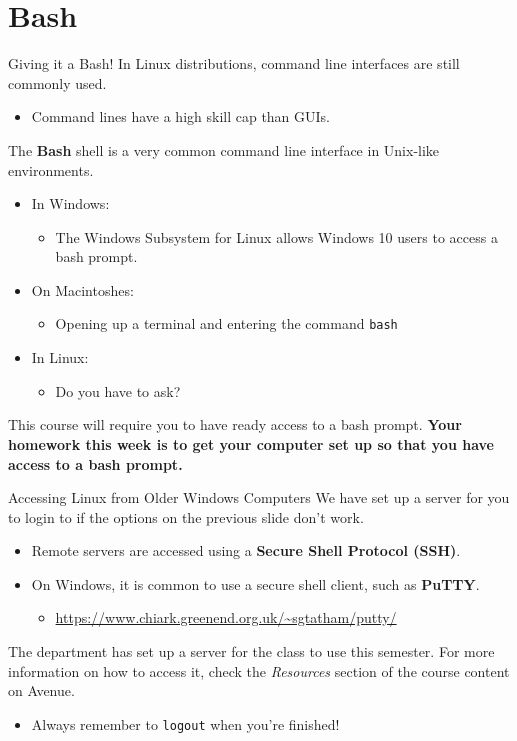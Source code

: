 \documentclass[11pt]{beamer}
\begin{document}
\section[Using a Command Line]{Bash}
\begin{frame}{Giving it a Bash!}
In Linux distributions, command line interfaces are still commonly used.
\begin{itemize}
\item Command lines have a high skill cap than GUIs.  
\end{itemize}
The \textbf{Bash} shell is a very common command line interface in Unix-like environments.
\begin{itemize}
\item In Windows:
	\begin{itemize}
	\item The Windows Subsystem for Linux allows Windows 10 users to access a bash prompt. 
	\end{itemize}
\item On Macintoshes:
	\begin{itemize}
	\item Opening up a terminal and entering the command \texttt{bash}
	\end{itemize}
\item In Linux:
	\begin{itemize}
	\item Do you have to ask? 
	\end{itemize}
\end{itemize}
This course will require you to have ready access to a bash prompt.  \textbf{Your homework this week is to get your computer set up so that you have access to a bash prompt.}  
\end{frame}

\begin{frame}{Accessing Linux from Older Windows Computers}
We have set up a server for you to login to if the options on the previous slide don't work.  
\begin{itemize}
\item Remote servers are accessed using a \textbf{Secure Shell Protocol (SSH)}.  
\item On Windows, it is common to use a secure shell client, such as \textbf{PuTTY}.
\begin{itemize}
\item \url{https://www.chiark.greenend.org.uk/~sgtatham/putty/}
\end{itemize}
\end{itemize}
The department has set up a server for the class to use this semester.  For more information on how to access it, check the \emph{Resources} section of the course content on Avenue.
\begin{itemize}
\item Always remember to \texttt{logout} when you're finished! 
\end{itemize}
\end{frame}
\end{document}
